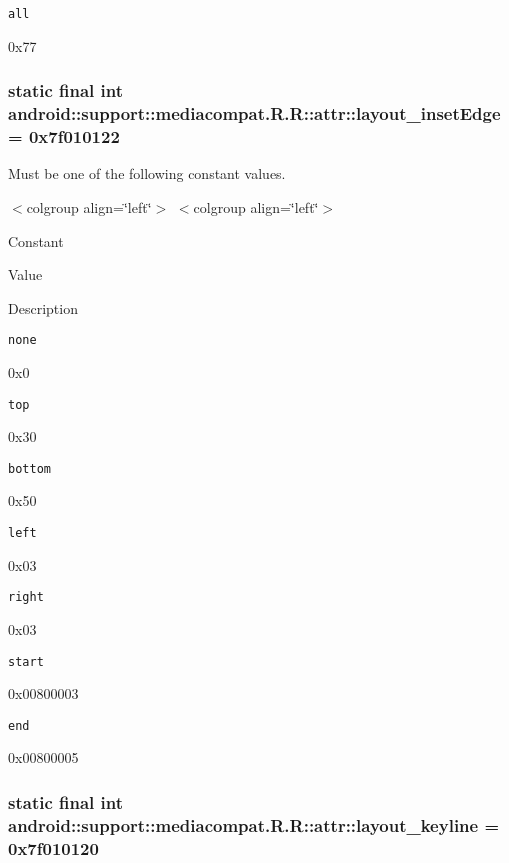 {\tt all}

0x77\hypertarget{classandroid_1_1support_1_1mediacompat_1_1_r_1_1attr_d576ddb515f2fdde8e1649093604b662}{
\subsubsection[{layout\_\-insetEdge}]{\setlength{\rightskip}{0pt plus 5cm}static final int android::support::mediacompat.R.R::attr::layout\_\-insetEdge = 0x7f010122}}
\label{classandroid_1_1support_1_1mediacompat_1_1_r_1_1attr_d576ddb515f2fdde8e1649093604b662}


Must be one of the following constant values. \begin{TabularC}{0}
\hline
\end{TabularC}
$<$colgroup align=\char`\"{}left\char`\"{}$>$ $<$colgroup align=\char`\"{}left\char`\"{}$>$ 

Constant

Value

Description 

{\tt none}

0x0

{\tt top}

0x30

{\tt bottom}

0x50

{\tt left}

0x03

{\tt right}

0x03

{\tt start}

0x00800003

{\tt end}

0x00800005\hypertarget{classandroid_1_1support_1_1mediacompat_1_1_r_1_1attr_57d647f1854f4312498d0df8400663a7}{
\subsubsection[{layout\_\-keyline}]{\setlength{\rightskip}{0pt plus 5cm}static final int android::support::mediacompat.R.R::attr::layout\_\-keyline = 0x7f010120}}
\label{classandroid_1_1support_1_1mediacompat_1_1_r_1_1attr_57d647f1854f4312498d0df8400663a7}


